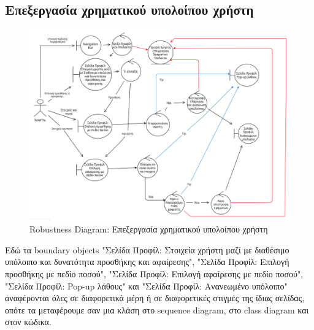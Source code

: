 \documentclass[12pt,a4paper]{article}
\begin{document}
\subsection{Επεξεργασία χρηματικού υπολοίπου χρήστη}
\begin{figure}[H]
	\includegraphics[width=\textwidth]{Edit User Balance Robustness.png}
	\caption{Robustness Diagram: Επεξεργασία χρηματικού υπολοίπου χρήστη}
	\label{Robustness Diagram: Επεξεργασία χρηματικού υπολοίπου χρήστη}
\end{figure}

Εδώ τα boundary objects "Σελίδα Προφίλ: Στοιχεία χρήστη μαζί με διαθέσιμο υπόλοιπο και δυνατότητα προσθήκης και αφαίρεσης", "Σελίδα Προφίλ: Επιλογή προσθήκης με πεδίο ποσού", "Σελίδα Προφίλ: Επιλογή αφαίρεσης με πεδίο ποσού", "Σελίδα Προφίλ: Pop-up λάθους" και "Σελίδα Προφίλ: Ανανεωμένο υπόλοιπο" αναφέρονται όλες σε διαφορετικά μέρη ή σε διαφορετικές στιγμές της ίδιας σελίδας, οπότε τα μεταφέρουμε σαν μια κλάση στο sequence diagram, στο class diagram και στον κώδικα.
\end{document}
